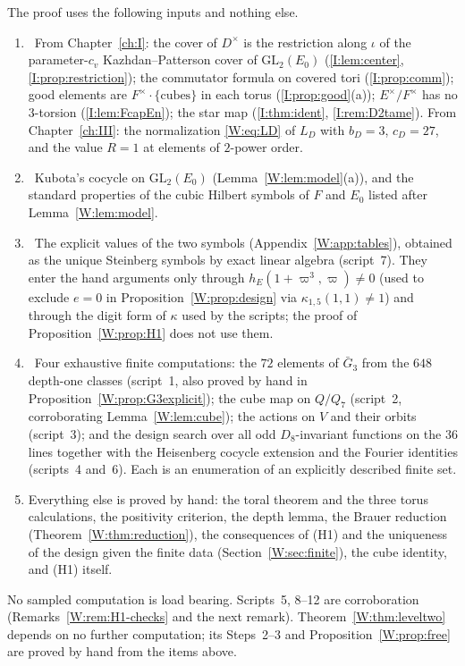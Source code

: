 \begin{remark}\label{W:rem:dependencies}
The proof uses the following inputs and nothing else.
\begin{enumerate}[label=(D\arabic*),leftmargin=*]
\item \Etag\ From Chapter~\ref{ch:I}: the cover of $D^\times$ is the restriction
along $\iota$ of the parameter-$c_v$ Kazhdan--Patterson cover of
$\mathrm{GL}_2(E_0)$ (\cref{I:lem:center}, \cref{I:prop:restriction}); the commutator
formula on covered tori (\cref{I:prop:comm}); good elements are
$F^\times\cdot\{\text{cubes}\}$ in each torus (\cref{I:prop:good}(a));
$E^\times/F^\times$ has no $3$-torsion (\cref{I:lem:FcapEn}); the star map
(\cref{I:thm:ident}, \cref{I:rem:D2tame}).  From Chapter~\ref{ch:III}: the normalization
\eqref{W:eq:LD} of $L_D$ with $b_D=3$, $c_D=27$, and the value $R=1$ at
elements of $2$-power order.
\item \Etag\ Kubota's cocycle on $\mathrm{GL}_2(E_0)$
(Lemma~\ref{W:lem:model}(a)), and the standard properties of the cubic
Hilbert symbols of $F$ and $E_0$ listed after Lemma~\ref{W:lem:model}.
\item \Pctag\ The explicit values of the two symbols
(Appendix~\ref{W:app:tables}), obtained as the unique Steinberg symbols
by exact linear algebra (script~7).  They enter the hand arguments only
through $h_E(1+\varpi^3,\varpi)\ne0$ (used to exclude $e=0$ in
Proposition~\ref{W:prop:design} via $\kappa_{1,5}(1,1)\ne1$) and through
the digit form of $\kappa$ used by the scripts; the proof of
Proposition~\ref{W:prop:H1} does not use them.
\item \Pctag\ Four exhaustive finite computations: the $72$ elements of
$\bar G_3$ from the $648$ depth-one classes (script~1, also proved by
hand in Proposition~\ref{W:prop:G3explicit}); the cube map on $Q/Q_7$
(script~2, corroborating Lemma~\ref{W:lem:cube}); the actions on $V$ and
their orbits (script~3); and the design search over all odd
$D_8$-invariant functions on the $36$ lines together with the
Heisenberg cocycle extension and the Fourier identities (scripts~4
and~6).  Each is an enumeration of an explicitly described finite set.
\item Everything else is proved by hand: the toral theorem and
the three torus calculations, the positivity criterion, the depth
lemma, the Brauer reduction (Theorem~\ref{W:thm:reduction}), the
consequences of (H1) and the uniqueness of the design given the finite
data (Section~\ref{W:sec:finite}), the cube identity, and (H1) itself.
\end{enumerate}
No sampled computation is load bearing.  Scripts~5, 8--12 are
corroboration (Remarks~\ref{W:rem:H1-checks} and the next remark).
Theorem~\ref{W:thm:leveltwo} depends on no further computation; its
Steps~2--3 and Proposition~\ref{W:prop:free} are proved by hand from the
items above.
\end{remark}

